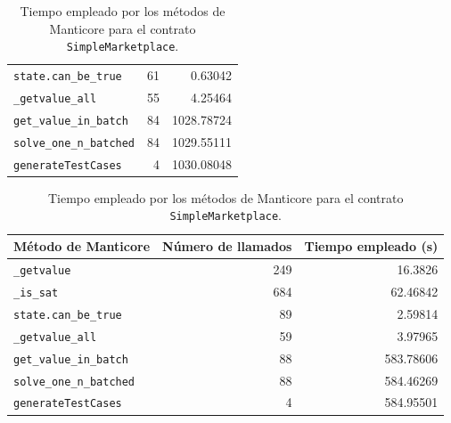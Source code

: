 \begin{table}[ht]
\begin{minipage}{0.95\textwidth}
\begin{tabular}[t]{l @{\hskip 30pt} r @{\hskip 30pt} r}
            \rowcolor{color2} \texttt{state.can\_be\_true}    & 61                          & 0.63042                      \\
            \rowcolor{color1} \texttt{\_getvalue\_all}        & 55                          & 4.25464                      \\
            \rowcolor{color2} \texttt{get\_value\_in\_batch}  & 84                          & 1028.78724                   \\
            \rowcolor{color2} \texttt{solve\_one\_n\_batched} & 84                          & 1029.55111                   \\
            \rowcolor{color3} \texttt{generateTestCases}      & 4                           & 1030.08048                   \\
            \bottomrule
        \end{tabular}
        \caption{Tiempo empleado por los métodos de Manticore para el contrato \texttt{SimpleMarketplace}.}
    \end{minipage}
    \begin{minipage}{0.95\textwidth}
        \centering
        \begin{tabular}[t]{l @{\hskip 30pt} r @{\hskip 30pt} r}
            \toprule
            \textbf{Método de Manticore}                      & \textbf{Número de llamados} & \textbf{Tiempo empleado (s)} \\
            \midrule
            \rowcolor{color1} \texttt{\_getvalue}             & 249                         & 16.3826                      \\
            \rowcolor{color1} \texttt{\_is\_sat}              & 684                         & 62.46842                     \\
            \rowcolor{color2} \texttt{state.can\_be\_true}    & 89                          & 2.59814                      \\
            \rowcolor{color1} \texttt{\_getvalue\_all}        & 59                          & 3.97965                      \\
            \rowcolor{color2} \texttt{get\_value\_in\_batch}  & 88                          & 583.78606                    \\
            \rowcolor{color2} \texttt{solve\_one\_n\_batched} & 88                          & 584.46269                    \\
            \rowcolor{color3} \texttt{generateTestCases}      & 4                           & 584.95501                    \\

\end{tabular}
\end{minipage}
\end{table}
